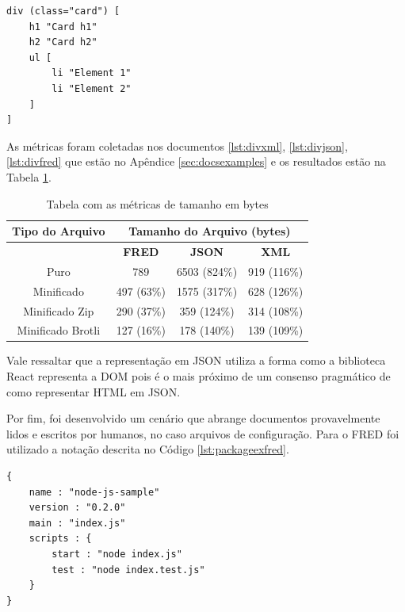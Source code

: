 \begin{lstlisting}[float,floatplacement=H,caption=Exemplo de dado representando HTML,label={lst:divexfred}]
div (class="card") [
    h1 "Card h1"
    h2 "Card h2"
    ul [
        li "Element 1"
        li "Element 2"
    ]
]
\end{lstlisting}

As métricas foram coletadas nos documentos \ref{lst:divxml}, \ref{lst:divjson},
\ref{lst:divfred} que estão no Apêndice \ref{sec:docsexamples} 
e os resultados estão na Tabela \ref{tbl:divdocs}.

\begin{table}[h]
    \centering
	\caption{Tabela com as métricas de tamanho em bytes}
	\label{tbl:divdocs}
    \begin{tabular}{cccc}
        \toprule
        \multicolumn{1}{c}{\textbf{Tipo do Arquivo}} & \multicolumn{3}{c}{\textbf{Tamanho do Arquivo (bytes)}} \\
        \midrule
                                                     & \textbf{FRED} & \textbf{JSON} & \textbf{XML}    \\
        \midrule
        Puro  & 789 & 6503 (824\%) & 919 (116\%)\\
		Minificado & 497 (63\%) & 1575 (317\%) & 628 (126\%) \\
        Minificado Zip & 290 (37\%) & 359 (124\%) & 314 (108\%) \\
        Minificado Brotli & 127 (16\%) & 178 (140\%) & 139 (109\%) \\
		\bottomrule
    \end{tabular}
\end{table}

Vale ressaltar que a representação em JSON utiliza a forma como a biblioteca React
representa a DOM pois é o mais próximo de um consenso pragmático
de como representar HTML em JSON.

Por fim, foi desenvolvido um cenário que abrange documentos provavelmente
lidos e escritos por humanos, no caso arquivos de configuração. Para o 
FRED foi utilizado a notação descrita no Código \ref{lst:packageexfred}.

\begin{lstlisting}[caption=Exemplo de documento para arquivo de configuração ,label={lst:packageexfred}]
{
    name : "node-js-sample"
    version : "0.2.0"
    main : "index.js"
    scripts : {
        start : "node index.js"
        test : "node index.test.js"
    }
}
\end{lstlisting}

